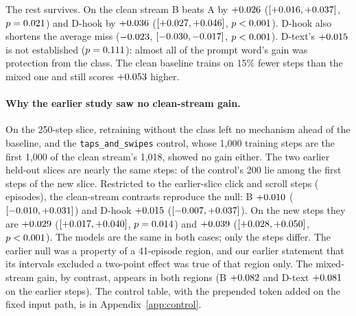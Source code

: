 \documentclass[letterpaper]{article} %
\newcommand{\mix}[1]{\texttt{#1}}
\begin{document}
The rest survives. On the clean stream B beats A by $+0.026$ ($[+0.016, +0.037]$, $p = 0.021$) and D-hook by $+0.036$ ($[+0.027, +0.046]$, $p < 0.001$). D-hook also shortens the average miss ($-0.023$, $[-0.030, -0.017]$, $p < 0.001$). D-text's $+0.015$ is not established ($p = 0.111$): almost all of the prompt word's gain was protection from the class. The clean baseline trains on 15\% fewer steps than the mixed one and still scores $+0.053$ higher.

\paragraph{Why the earlier study saw no clean-stream gain.} On the 250-step slice, retraining without the class left no mechanism ahead of the baseline, and the \mix{taps\_and\_swipes} control, whose 1,000 training steps are the first 1,000 of the clean stream's 1,018, showed no gain either. The two earlier held-out slices are nearly the same steps: \nCtlInSlice{} of the control's 200 lie among the first \nSliceOverlap{} steps of the new slice. Restricted to the \nSliceOldSpatial{} earlier-slice click and scroll steps (\nSliceOldEps{} episodes), the clean-stream contrasts reproduce the null: B $+0.010$ ($[-0.010, +0.031]$) and D-hook $+0.015$ ($[-0.007, +0.037]$). On the new steps they are $+0.029$ ($[+0.017, +0.040]$, $p = 0.014$) and $+0.039$ ($[+0.028, +0.050]$, $p < 0.001$). The models are the same in both cases; only the steps differ. The earlier null was a property of a 41-episode region, and our earlier statement that its intervals excluded a two-point effect was true of that region only. The mixed-stream gain, by contrast, appears in both regions (B $+0.082$ and D-text $+0.081$ on the earlier steps). The control table, with the prepended token added on the fixed input path, is in Appendix~\ref{app:control}.


\end{document}

